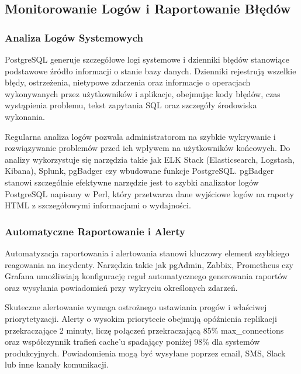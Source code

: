 \documentclass[letterpaper,10pt,polish]{sphinxmanual}
\begin{document}
\subsection{Monitorowanie Logów i Raportowanie Błędów}
\label{\detokenize{rozdzial2/repo-wspolne/index:monitorowanie-logow-i-raportowanie-bledow}}

\subsubsection{Analiza Logów Systemowych}
\label{\detokenize{rozdzial2/repo-wspolne/index:analiza-logow-systemowych}}
\sphinxAtStartPar
PostgreSQL generuje szczegółowe logi systemowe i dzienniki błędów stanowiące podstawowe źródło informacji o stanie bazy danych. Dzienniki rejestrują wszelkie błędy, ostrzeżenia, nietypowe zdarzenia oraz informacje o operacjach wykonywanych przez użytkowników i aplikacje, obejmując kody błędów, czas wystąpienia problemu, tekst zapytania SQL oraz szczegóły środowiska wykonania.

\sphinxAtStartPar
Regularna analiza logów pozwala administratorom na szybkie wykrywanie i rozwiązywanie problemów przed ich wpływem na użytkowników końcowych. Do analizy wykorzystuje się narzędzia takie jak ELK Stack (Elasticsearch, Logstash, Kibana), Splunk, pgBadger czy wbudowane funkcje PostgreSQL. pgBadger stanowi szczególnie efektywne narzędzie \sphinxhyphen{} jest to szybki analizator logów PostgreSQL napisany w Perl, który przetwarza dane wyjściowe logów na raporty HTML z szczegółowymi informacjami o wydajności.


\subsubsection{Automatyczne Raportowanie i Alerty}
\label{\detokenize{rozdzial2/repo-wspolne/index:automatyczne-raportowanie-i-alerty}}
\sphinxAtStartPar
Automatyzacja raportowania i alertowania stanowi kluczowy element szybkiego reagowania na incydenty. Narzędzia takie jak pgAdmin, Zabbix, Prometheus czy Grafana umożliwiają konfigurację reguł automatycznego generowania raportów oraz wysyłania powiadomień przy wykryciu określonych zdarzeń.

\sphinxAtStartPar
Skuteczne alertowanie wymaga ostrożnego ustawiania progów i właściwej priorytetyzacji. Alerty o wysokim priorytecie obejmują opóźnienia replikacji przekraczające 2 minuty, liczę połączeń przekraczającą 85\% max\_connections oraz współczynnik trafień cache’u spadający poniżej 98\% dla systemów produkcyjnych. Powiadomienia mogą być wysyłane poprzez e\sphinxhyphen{}mail, SMS, Slack lub inne kanały komunikacji.
\end{document}
